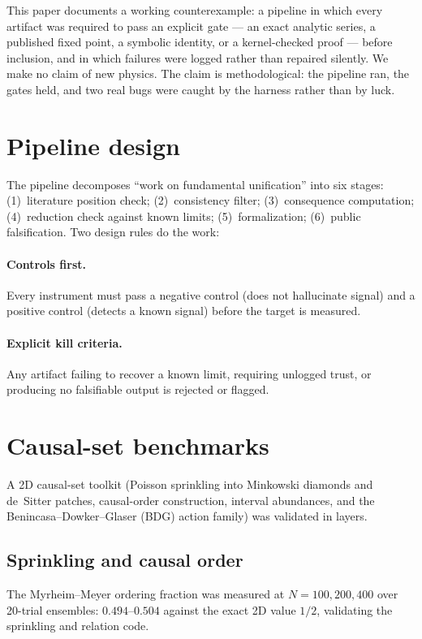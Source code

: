 \documentclass[11pt]{article}
\begin{document}
This paper documents a working counterexample: a pipeline in which every
artifact was required to pass an explicit gate --- an exact analytic series, a
published fixed point, a symbolic identity, or a kernel-checked proof ---
before inclusion, and in which failures were logged rather than repaired
silently. We make no claim of new physics. The claim is methodological: the
pipeline ran, the gates held, and two real bugs were caught by the harness
rather than by luck.

\section{Pipeline design}

The pipeline decomposes ``work on fundamental unification'' into six stages:
(1)~literature position check; (2)~consistency filter; (3)~consequence
computation; (4)~reduction check against known limits; (5)~formalization;
(6)~public falsification. Two design rules do the work:

\paragraph{Controls first.} Every instrument must pass a negative control
(does not hallucinate signal) and a positive control (detects a known signal)
before the target is measured.

\paragraph{Explicit kill criteria.} Any artifact failing to recover a known
limit, requiring unlogged trust, or producing no falsifiable output is
rejected or flagged.

\section{Causal-set benchmarks}

A 2D causal-set toolkit (Poisson sprinkling into Minkowski diamonds and
de~Sitter patches, causal-order construction, interval abundances, and the
Benincasa--Dowker--Glaser (BDG) action family) was validated in layers.

\subsection{Sprinkling and causal order}
The Myrheim--Meyer ordering fraction was measured at $N = 100, 200, 400$ over
20-trial ensembles: $0.494$--$0.504$ against the exact 2D value $1/2$,
validating the sprinkling and relation code.
\end{document}
